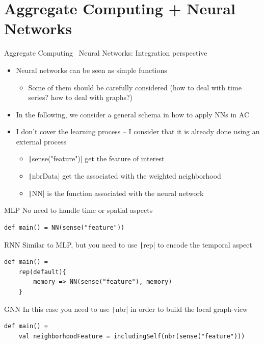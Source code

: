 \documentclass[presentation, 9pt]{beamer}\mode<presentation>{\usetheme{AMSBolognaFC}}
\begin{document}
\section{Aggregate Computing + Neural Networks}
\begin{frame}{Aggregate Computing \faPlus \, Neural Networks: Integration perspective}
\begin{itemize} 
	\item Neural networks can be seen as simple functions
	\begin{itemize}
		\item Some of them should be carefully considered (how to deal with time series? how to deal with graphs?)
	\end{itemize}
	\item In the following, we consider a general schema in how to apply NNs in AC
	\item I don't cover the learning process -- I consider that it is already done using an external process
	\begin{itemize}
		\item \texttt|sense("feature")| get the feature of interest
		\item \texttt|nbrData| get the associated with the weighted neighborhood
		\item \texttt|NN| is the function associated with the neural network
	\end{itemize}
\end{itemize}
\begin{alertblock}{MLP}
No need to handle time or spatial aspects
\begin{verbatim}
def main() = NN(sense("feature"))
\end{verbatim}
\end{alertblock}
\begin{alertblock}{RNN}
Similar to MLP, but you need to use \texttt|rep| to encode the temporal aspect
\begin{verbatim}
def main() = 
	rep(default){
		memory => NN(sense("feature"), memory)
	}
\end{verbatim}
\end{alertblock}
\begin{alertblock}{GNN}
	In this case you need to use \texttt|nbr| in order to build the local graph-view
\begin{verbatim}
def main() = 
	val neighborhoodFeature = includingSelf(nbr(sense("feature")))

\end{verbatim}
\end{alertblock}
\end{frame}
\end{document}
